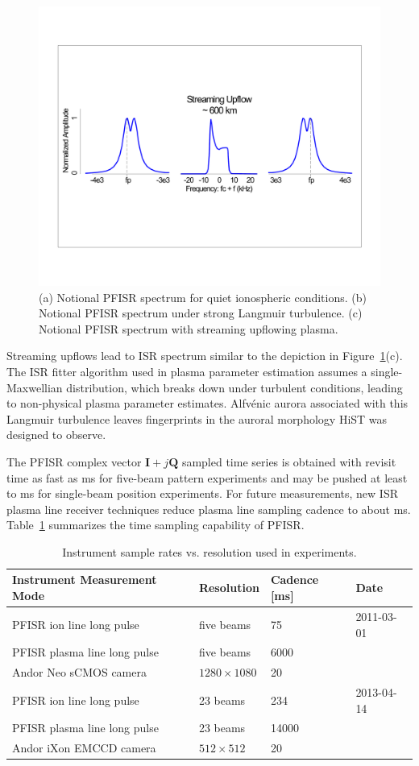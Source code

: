 \begin{figure}
    \includegraphics[width=0.8\columnwidth,trim=80 260 100 270,clip]{gfx/isr_streamupflow}
    \caption{(a) Notional PFISR spectrum for quiet ionospheric conditions. 
    	(b) Notional PFISR spectrum under strong Langmuir turbulence. 
    	(c) Notional PFISR spectrum with streaming upflowing plasma.}
    \label{fig:isrmorph}
\end{figure}
Streaming upflows lead to ISR spectrum similar to the depiction in Figure~\ref{fig:isrmorph}(c).
The ISR fitter algorithm used in plasma parameter estimation assumes a single-Maxwellian distribution, which breaks down under turbulent conditions, leading to non-physical plasma parameter estimates.
Alfvénic aurora associated with this Langmuir turbulence leaves fingerprints in the auroral morphology HiST was designed to observe.

The PFISR complex vector $\mathbf{I}+j\mathbf{Q}$ sampled time series is obtained with revisit time as fast as \unit[75]{ms} \citep{akbari2012} for five-beam pattern experiments and may be pushed at least to \unit[19]{ms} \citep{michell2009} for single-beam position experiments.
For future measurements, new ISR plasma line receiver techniques \citep{vierinen2016} reduce plasma line sampling cadence to about \unit[200]{ms}.
Table~\ref{tab:cadence} summarizes the time sampling capability of PFISR.
\begin{table}\centering
    \caption{Instrument sample rates vs. resolution used in experiments.}\label{tab:cadence}
    \begin{tabular}{llll}
        \toprule
        Instrument Measurement Mode & Resolution & Cadence [ms] & Date\\
        \midrule
        PFISR ion line long pulse & five beams    & 75   & 2011-03-01 \\
        PFISR plasma line long pulse & five beams & 6000 &  \\
        Andor Neo sCMOS camera & $1280 \times 1080$  & 20 &  \\
        \midrule
        PFISR ion line long pulse & 23 beams      & 234  & 2013-04-14 \\
        PFISR plasma line long pulse & 23 beams & 14000 &  \\
        Andor iXon EMCCD camera & $512 \times 512$ & 20 & \\
        \bottomrule
    \end{tabular}
\end{table}

